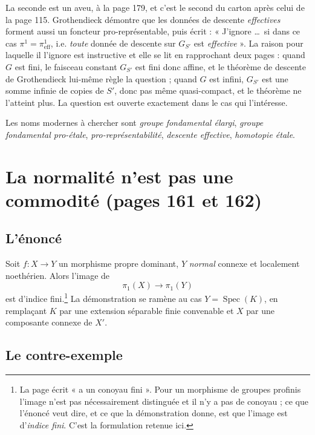 \documentclass[11pt,a4paper]{article}
\begin{document}
\begin{resume}
La seconde est un aveu, à la page 179, et c'est le second du carton après celui
de la page 115. Grothendieck démontre que les données de descente
\emph{effectives} forment aussi un foncteur pro-représentable, puis écrit :
« J'ignore \dots\ si dans ce cas $\pi^{1} = \pi^{1}_{\mathrm{eff}}$, i.e.
\emph{toute} donnée de descente sur $G_{S'}$ est \emph{effective} ». La raison
pour laquelle il l'ignore est instructive et elle se lit en rapprochant deux
pages : quand $G$ est fini, le faisceau constant $G_{S'}$ est fini donc affine,
et le théorème de descente de Grothendieck lui-même règle la question ; quand
$G$ est infini, $G_{S'}$ est une somme infinie de copies de $S'$, donc pas même
quasi-compact, et le théorème ne l'atteint plus. La question est ouverte
exactement dans le cas qui l'intéresse.

Les noms modernes à chercher sont \emph{groupe fondamental élargi},
\emph{groupe fondamental pro-étale}, \emph{pro-représentabilité},
\emph{descente effective}, \emph{homotopie étale}.

\end{resume}

\section*{La normalité n'est pas une commodité (pages 161 et 162)}

\subsection*{L'énoncé}

Soit $f : X \to Y$ un morphisme propre dominant, $Y$ \emph{normal} connexe et
localement noethérien. Alors l'image de
\[
  \pi_{1}(X) \longrightarrow \pi_{1}(Y)
\]
est d'indice fini.\footnote{La page écrit « a un conoyau fini ». Pour un
morphisme de groupes profinis l'image n'est pas nécessairement distinguée et il
n'y a pas de conoyau ; ce que l'énoncé veut dire, et ce que la démonstration
donne, est que l'image est d'\emph{indice fini}. C'est la formulation retenue
ici.} La démonstration se ramène au cas $Y = \operatorname{Spec}(K)$, en
remplaçant $K$ par une extension séparable finie convenable et $X$ par une
composante connexe de $X'$.

\subsection*{Le contre-exemple}
\end{document}
